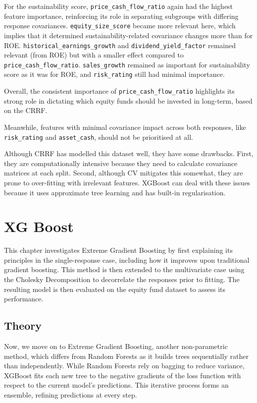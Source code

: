 \documentclass[11pt]{report} %
\begin{document}
For the sustainability score, \texttt{price\_cash\_flow\_ratio} again had the highest feature importance, reinforcing its role in separating subgroups with differing response covariances. \texttt{equity\_size\_score} became more relevant here, which implies that it determined sustainability-related covariance changes more than for ROE. \texttt{historical\_earnings\_growth} and \texttt{dividend\_yield\_factor} remained relevant (from ROE) but with a smaller effect compared to \texttt{price\_cash\_flow\_ratio}. \texttt{sales\_growth} remained as important for sustainability score as it was for ROE, and \texttt{risk\_rating} still had minimal importance.

Overall, the consistent importance of \texttt{price\_cash\_flow\_ratio} highlights its strong role in dictating which equity funds should be invested in long-term, based on the CRRF. 

Meanwhile, features with minimal covariance impact across both responses, like \texttt{risk\_rating} and \texttt{asset\_cash}, should not be prioritised at all. 

Although CRRF has modelled this dataset well, they have some drawbacks. First, they are computationally intensive because they need to calculate covariance matrices at each split. Second, although CV mitigates this somewhat, they are prone to over-fitting with irrelevant features. XGBoost can deal with these issues because it uses approximate tree learning and has built-in regularisation.

\chapter{XG Boost}
\label{xgboost}
This chapter investigates Extreme Gradient Boosting by first explaining its principles in the single-response case, including how it improves upon traditional gradient boosting. %
This method is then extended to the multivariate case using the Cholesky Decomposition to decorrelate the responses prior to fitting. The resulting model is then evaluated on the equity fund dataset to assess its performance.

\section{Theory}
Now, we move on to Extreme Gradient Boosting, another non-parametric method, which differs from Random Forests as it builds trees sequentially rather than independently. While Random Forests rely on bagging to reduce variance, XGBoost fits each new tree to the negative gradients of the loss function with respect to the current model's predictions. This iterative process forms an ensemble, refining predictions at every step.
\end{document}
